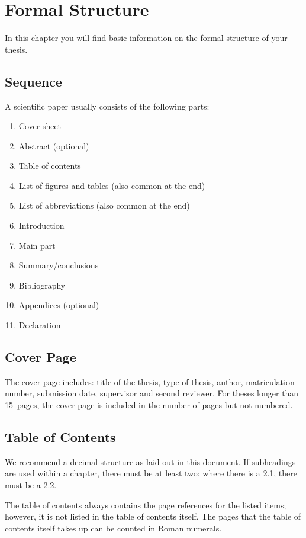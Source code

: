 \chapter{Formal Structure}
\label{chap:formal}
%
In this chapter you will find basic information on the formal structure of your 
thesis.

\section{Sequence}
\label{sec:aufbau}
A scientific paper usually consists of the following parts:
%
\begin{enumerate}
 \item Cover sheet
 \item Abstract (optional)
 \item Table of contents
 \item List of figures and tables (also common at the end)
 \item List of abbreviations (also common at the end)
 \item Introduction
 \item Main part
 \item Summary\slash conclusions
 \item Bibliography
 \item Appendices (optional)
 \item Declaration
\end{enumerate}

\section{Cover Page}
The cover page includes: title of the thesis, type of thesis, author, 
matriculation number, submission date, supervisor and second reviewer. For 
theses longer than 15~pages, the cover page is included in the number of pages 
but not numbered.
%
\section{Table of Contents}
\label{sec:listOfContents}
We recommend a decimal structure as laid out in this document. If subheadings 
are used within a chapter, there must be at least two: where there is a 2.1, 
there must be a 2.2.

The table of contents always contains the page references for the listed items; 
however, it is not listed in the table of contents itself. The pages that the 
table of contents itself takes up can be counted in Roman numerals.

